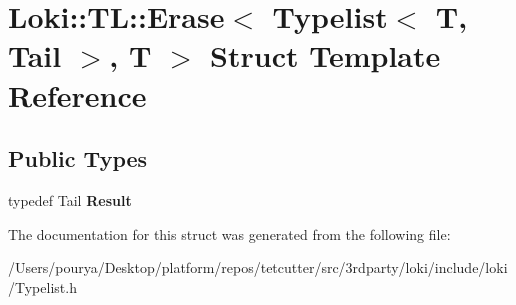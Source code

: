 \hypertarget{structLoki_1_1TL_1_1Erase_3_01Typelist_3_01T_00_01Tail_01_4_00_01T_01_4}{}\section{Loki\+:\+:T\+L\+:\+:Erase$<$ Typelist$<$ T, Tail $>$, T $>$ Struct Template Reference}
\label{structLoki_1_1TL_1_1Erase_3_01Typelist_3_01T_00_01Tail_01_4_00_01T_01_4}
\subsection*{Public Types}
\begin{DoxyCompactItemize}
\item 
\hypertarget{structLoki_1_1TL_1_1Erase_3_01Typelist_3_01T_00_01Tail_01_4_00_01T_01_4_a51e37be1c82fe6aab7d76406598cacf8}{}typedef Tail {\bfseries Result}\label{structLoki_1_1TL_1_1Erase_3_01Typelist_3_01T_00_01Tail_01_4_00_01T_01_4_a51e37be1c82fe6aab7d76406598cacf8}

\end{DoxyCompactItemize}


The documentation for this struct was generated from the following file\+:\begin{DoxyCompactItemize}
\item 
/\+Users/pourya/\+Desktop/platform/repos/tetcutter/src/3rdparty/loki/include/loki/Typelist.\+h\end{DoxyCompactItemize}
